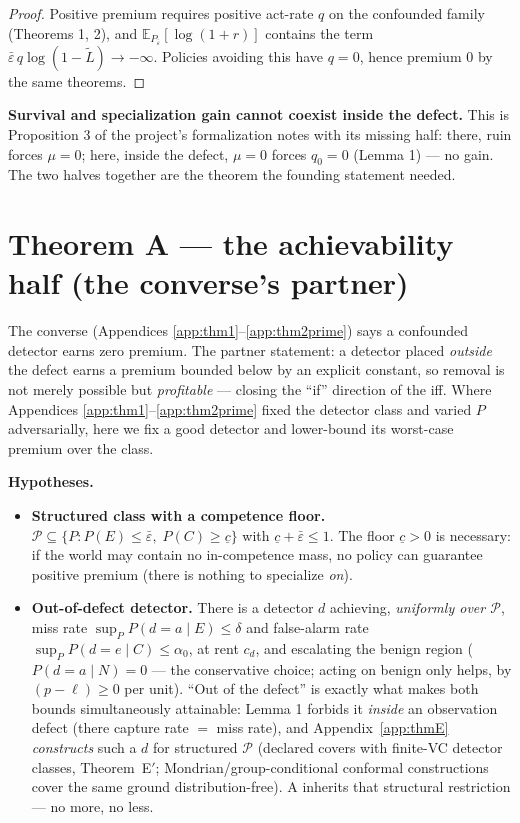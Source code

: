 \documentclass[11pt]{article}
\theoremstyle{plain}
\theoremstyle{definition}
\begin{document}
\begin{proof}
Positive premium requires positive act-rate $q$ on the confounded
family (Theorems 1, 2), and $\mathbb{E}_{P_{\bar\varepsilon}}[\log(1+r)]$
contains the term $\bar\varepsilon\, q \log(1 - \tilde L) \to -\infty$.
Policies avoiding this have $q = 0$, hence premium $0$ by the same theorems.
\end{proof}

\textbf{Survival and specialization gain cannot coexist inside the defect.} This
is Proposition 3 of the project's formalization notes with its missing half: there, ruin
forces $\mu = 0$; here, inside the defect, $\mu = 0$ forces $q_0 = 0$
(Lemma 1) --- no gain. The two halves together are the theorem the founding
statement needed.

\section{Theorem A --- the achievability half (the converse's partner)}\label{app:thmA}

The converse (Appendices \ref{app:thm1}--\ref{app:thm2prime}) says a confounded detector earns zero premium. The
partner statement: a detector placed \emph{outside} the defect earns a premium
bounded below by an explicit constant, so removal is not merely possible but
\emph{profitable} --- closing the ``if'' direction of the iff. Where Appendices \ref{app:thm1}--\ref{app:thm2prime} fixed the
detector class and varied $P$ adversarially, here we fix a good detector and
lower-bound its worst-case premium over the class.

\textbf{Hypotheses.}
\begin{itemize}
\item \textbf{Structured class with a competence floor.}
  $\mathcal{P} \subseteq \{P : P(E) \leq \bar\varepsilon,\; P(C) \geq \underline{c}\}$
  with $\underline{c} + \bar\varepsilon \leq 1$. The floor $\underline c > 0$
  is necessary: if the world may contain no in-competence mass, no policy can
  guarantee positive premium (there is nothing to specialize \emph{on}).
\item \textbf{Out-of-defect detector.} There is a detector $d$ achieving, \emph{uniformly
  over $\mathcal{P}$}, miss rate $\sup_P P(d{=}a \mid E) \leq \delta$ and
  false-alarm rate $\sup_P P(d{=}e \mid C) \leq \alpha_0$, at rent $c_d$, and
  escalating the benign region ($P(d{=}a \mid N) = 0$ --- the conservative
  choice; acting on benign only helps, by $(p-\ell) \geq 0$ per unit). ``Out of
  the defect'' is exactly what makes both bounds simultaneously attainable:
  Lemma 1 forbids it \emph{inside} an observation defect (there capture rate $=$
  miss rate), and Appendix~\ref{app:thmE} \emph{constructs} such a $d$ for
  structured $\mathcal{P}$ (declared covers with finite-VC detector classes,
  Theorem~E$'$; Mondrian/group-conditional conformal constructions
  \citep{vovk2005} cover the same ground distribution-free). A inherits that
  structural restriction --- no more, no
  less.
\end{itemize}
\end{document}
